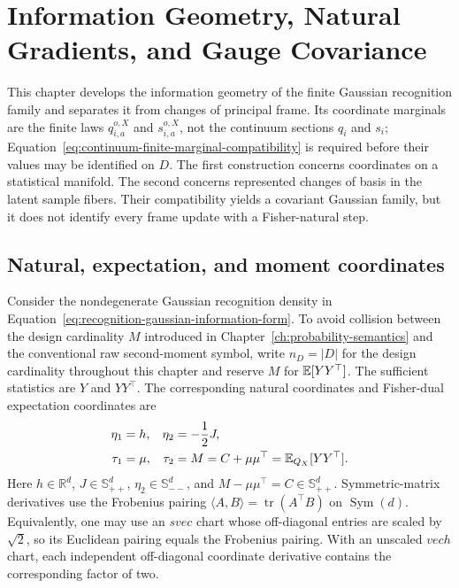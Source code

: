 \chapter{Information Geometry, Natural Gradients, and Gauge Covariance}
\label{ch:information-geometry-gauge}

This chapter develops the information geometry of the finite Gaussian recognition family and separates it from changes of principal frame. Its coordinate marginals are the finite laws \(q_{i,a}^{o,X}\) and \(s_{i,a}^{o,X}\), not the continuum sections \(q_i\) and \(s_i\); Equation~\eqref{eq:continuum-finite-marginal-compatibility} is required before their values may be identified on \(D\). The first construction concerns coordinates on a statistical manifold. The second concerns represented changes of basis in the latent sample fibers. Their compatibility yields a covariant Gaussian family, but it does not identify every frame update with a Fisher-natural step.

\section{Natural, expectation, and moment coordinates}

Consider the nondegenerate Gaussian recognition density in Equation~\eqref{eq:recognition-gaussian-information-form}. To avoid collision between the design cardinality \(M\) introduced in Chapter~\ref{ch:probability-semantics} and the conventional raw second-moment symbol, write \(n_D=|D|\) for the design cardinality throughout this chapter and reserve \(M\) for \(\mathbb E[YY^\top]\). The sufficient statistics are \(Y\) and \(YY^\top\). The corresponding natural coordinates and Fisher-dual expectation coordinates are
\begin{align}
\eta_1&=h,
&\eta_2&=-\frac12J,
\label{eq:gaussian-natural-coordinates}\\
\tau_1&=\mu,
&\tau_2&=M=C+\mu\mu^\top=\mathbb E_{Q_X}[YY^\top].
\label{eq:gaussian-expectation-coordinates}
\end{align}
Here \(h\in\mathbb R^d\), \(J\in\mathbb S_{++}^d\), \(\eta_2\in\mathbb S_{--}^d\), and \(M-\mu\mu^\top=C\in\mathbb S_{++}^d\). Symmetric-matrix derivatives use the Frobenius pairing \(\langle A,B\rangle=\operatorname{tr}(A^\top B)\) on \(\operatorname{Sym}(d)\). Equivalently, one may use an \(svec\) chart whose off-diagonal entries are scaled by \(\sqrt2\), so its Euclidean pairing equals the Frobenius pairing. With an unscaled \(vech\) chart, each independent off-diagonal coordinate derivative contains the corresponding factor of two.

